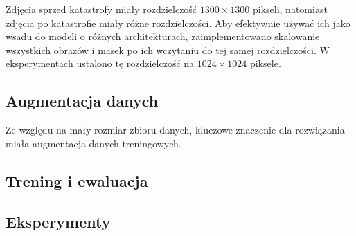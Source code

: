 Zdjęcia sprzed katastrofy miały rozdzielczość $1300\times 1300$ pikseli, natomiast zdjęcia po katastrofie miały różne rozdzielczości. Aby efektywnie używać ich jako wsadu do modeli o różnych architekturach, zaimplementowano skalowanie wszystkich obrazów i masek po ich wczytaniu do tej samej rozdzielczości. W eksperymentach ustalono tę rozdzielczość na $1024\times 1024$ piksele.
\subsection{Augmentacja danych}
Ze względu na mały rozmiar zbioru danych, kluczowe znaczenie dla rozwiązania miała augmentacja danych treningowych. 
\subsection{Trening i ewaluacja}

\subsection{Eksperymenty}

